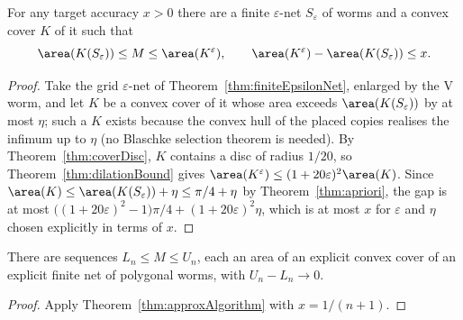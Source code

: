\begin{theorem}
    \label{thm:approxAlgorithm}
    \leanok
    For any target accuracy $x > 0$ there are a finite $\varepsilon$-net
    $S_\varepsilon$ of worms and a convex cover $K$ of it such that
    \[
        \area(K(S_\varepsilon)) \le M \le \area(K^{\varepsilon}),
        \qquad
        \area(K^{\varepsilon}) - \area(K(S_\varepsilon)) \le x .
    \]
\end{theorem}
\begin{proof}
    \leanok
    Take the grid $\varepsilon$-net of Theorem~\ref{thm:finiteEpsilonNet},
    enlarged by the V worm, and let $K$ be a convex cover of it whose area
    exceeds $\area(K(S_\varepsilon))$ by at most $\eta$; such a $K$ exists
    because the convex hull of the placed copies realises the infimum up to
    $\eta$ (no Blaschke selection theorem is needed). By
    Theorem~\ref{thm:coverDisc}, $K$ contains a disc of radius $1/20$, so
    Theorem~\ref{thm:dilationBound} gives
    $\area(K^{\varepsilon}) \le (1 + 20\varepsilon)^2 \area(K)$. Since
    $\area(K) \le \area(K(S_\varepsilon)) + \eta \le \pi/4 + \eta$ by
    Theorem~\ref{thm:apriori}, the gap is at most
    $\big((1+20\varepsilon)^2 - 1\big)\pi/4 + (1+20\varepsilon)^2 \eta$, which is
    at most $x$ for $\varepsilon$ and $\eta$ chosen explicitly in terms of $x$.
\end{proof}

\begin{corollary}
    \label{cor:convergentBounds}
    \leanok
    There are sequences $L_n \le M \le U_n$, each an area of an explicit convex
    cover of an explicit finite net of polygonal worms, with
    $U_n - L_n \to 0$.
\end{corollary}
\begin{proof}
    \leanok
    Apply Theorem~\ref{thm:approxAlgorithm} with $x = 1/(n+1)$.
\end{proof}

